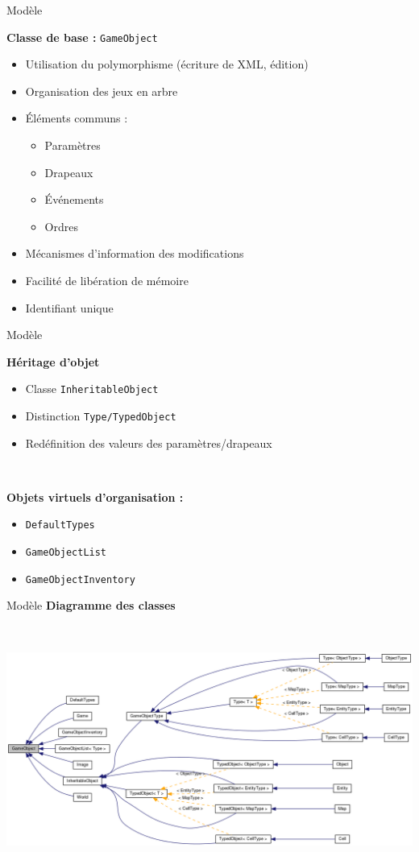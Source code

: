 \documentclass[11pt]{beamer}
\begin{document}
\begin{frame}{Modèle}


\textbf{Classe de base : } \texttt{GameObject} 
\begin{itemize}
\item Utilisation du polymorphisme (écriture de XML, édition)
\item Organisation des jeux en arbre
\item Éléments communs : 
\begin{itemize}
\item Paramètres
\item Drapeaux
\item Événements
\item Ordres
\end{itemize}
\item Mécanismes d'information des modifications
\item Facilité de libération de mémoire
\item Identifiant unique
\end{itemize}


\end{frame}
\begin{frame}{Modèle}

\textbf{Héritage d'objet}
\begin{itemize}
\item Classe \texttt{InheritableObject}
\item Distinction \texttt{Type/TypedObject}
\item Redéfinition des valeurs des paramètres/drapeaux
\end{itemize}

~

\textbf{Objets virtuels d'organisation :}
\begin{itemize}
\item \texttt{DefaultTypes}
\item \texttt{GameObjectList}
\item \texttt{GameObjectInventory}
\end{itemize}

\end{frame}


\begin{frame}{Modèle}
\textbf{Diagramme des classes}

~

\begin{center}
\includegraphics[scale=.24]{GameObject.png}
\end{center}

\end{frame}
\end{document}
